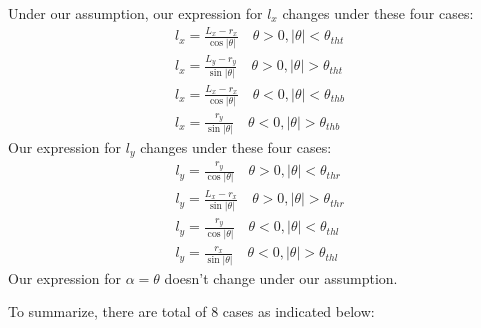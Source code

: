 \documentclass[12pt, letterpaper]{amsart} %
\numberwithin{equation}{section}
\begin{document}
Under our assumption, our expression for $l_x$  changes under these four cases:
\begin{align*}
  l_x = \frac{L_x - r_x}{\cos |\theta|} \quad \theta > 0, |\theta| < \theta_{tht} \\
  l_x = \frac{L_y - r_y}{\sin|\theta|} \quad \theta > 0, |\theta| > \theta_{tht} \\
  l_x = \frac{L_x - r_x}{\cos |\theta|} \quad \theta < 0, |\theta| < \theta_{thb} \\
  l_x = \frac{r_y}{\sin|\theta|} \quad \theta < 0, |\theta| > \theta_{thb}
\end{align*}
Our expression for $l_y$ changes under these four cases:
\begin{align*}
  l_y = \frac{r_y}{\cos |\theta|} \quad \theta > 0, |\theta| < \theta_{thr} \\
  l_y = \frac{L_x - r_x}{\sin |\theta|} \quad \theta > 0, |\theta| > \theta_{thr} \\
  l_y = \frac{r_y}{\cos |\theta|} \quad \theta < 0, |\theta| < \theta_{thl} \\
  l_y = \frac{r_x}{\sin |\theta|} \quad \theta < 0, |\theta| > \theta_{thl}
\end{align*}
Our expression for $\alpha = \theta$ doesn't change under our assumption. \par
\newpage
To summarize, there are total of 8 cases as indicated below:
\\
\end{document}
